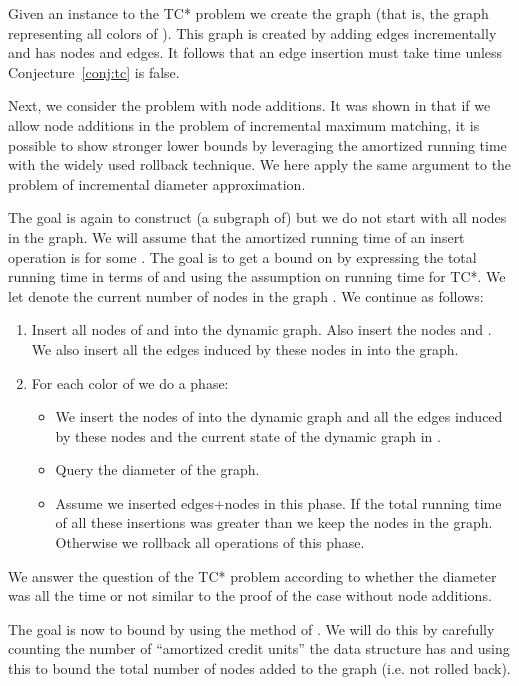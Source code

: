 \documentclass[a4paper,11pt]{article}
\theoremstyle{definition}
\begin{document}
Given an instance to the TC* problem we create the graph  (that is,
the graph representing all colors of ). This graph is created by adding
edges incrementally and has  nodes and edges. It follows that an edge
insertion must take  time unless Conjecture~\ref{conj:tc} is
false.

Next, we consider the problem with node additions. It was shown in
\cite{KopelowitzPP16} that if we allow node additions in the problem of
incremental maximum matching, it is possible to show stronger lower bounds by
leveraging the amortized running time with the widely used rollback technique.
We here apply the same argument to the problem of incremental diameter
approximation.

The goal is again to construct (a subgraph of)  but we do not start
with all nodes in the graph. We will assume that the amortized
running time of an insert operation is  for some . The goal
is to get a bound on  by expressing the total running time in terms of
 and using the assumption on running time for TC*. We let 
denote the current number of nodes in the graph . We continue as follows:
\begin{enumerate}
    \item Insert all nodes of  and  into the dynamic graph. Also insert
        the nodes  and . We also insert all the edges
        induced by these nodes in  into the graph.
    \item For each color  of  we do a phase:
        \begin{itemize}
            \item We insert the nodes of  into the dynamic graph
                and all the edges induced by these nodes and the current state
                of the dynamic graph in .
            \item Query the diameter of the graph.
            \item Assume we inserted  edges+nodes in this phase. If the
                total running time of all these insertions was greater than
                 we keep the nodes in the graph. Otherwise we
                rollback all operations of this phase.
        \end{itemize}
\end{enumerate}
We answer the question of the TC* problem according to whether the diameter was
 all the time or not similar to the proof of the case without
node additions.

The goal is now to bound  by using the method of \cite{KopelowitzPP16}. We will do
this by carefully counting the number of ``amortized credit units'' the data
structure has and using this to bound the total number of nodes added to the
graph (i.e. not rolled back).
\end{document}
